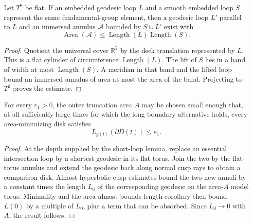 \begin{lemma}
\label{lem:chow-iv-flat-torus-annulus-area}
Let \(T^2\) be flat.  If an embedded geodesic loop \(L\) and a smooth embedded
loop \(S\) represent the same fundamental-group element, then a geodesic loop
\(L'\) parallel to \(L\) and an immersed annulus \(\mathcal A\) bounded by
\(S\cup L'\) exist with
\[
 \operatorname{Area}(\mathcal A)
 \le\operatorname{Length}(L)\operatorname{Length}(S).
\]
\end{lemma}

\begin{proof}
Quotient the universal cover \(\mathbb R^2\) by the deck translation
represented by \(L\).  This is a flat cylinder of circumference
\(\operatorname{Length}(L)\).  The lift of \(S\) lies in a band of width at most
\(\operatorname{Length}(S)\).  A meridian in that band and the lifted loop
bound an immersed annulus of area at most the area of the band.  Projecting to
\(T^2\) proves the estimate.
\end{proof}

\begin{proposition}
\label{prop:chow-iv-minimizing-disk-boundary-small}
For every \(\varepsilon_1>0\), the outer truncation area \(A\) may be chosen
small enough that, at all sufficiently large times for which the long-boundary
alternative holds, every area-minimizing disk satisfies
\[
 L_{g(t)}(\partial D(t))\le\varepsilon_1.
\]
\end{proposition}

\begin{proof}
At the depth supplied by the short-loop lemma, replace an essential
intersection loop by a shortest geodesic in its flat torus.  Join the two by
the flat-torus annulus and extend the geodesic back along normal cusp rays to
obtain a comparison disk.  Almost-hyperbolic cusp estimates bound the two new
annuli by a constant times the length \(L_0\) of the corresponding geodesic on
the area-\(A\) model torus.  Minimality and the area-almost-bounds-length
corollary then bound \(L(0)\) by a multiple of \(L_0\), plus a term that can be
absorbed.  Since \(L_0\to0\) with \(A\), the result follows.
\end{proof}

